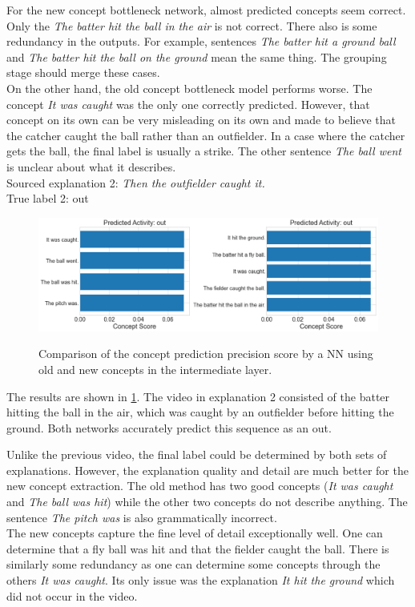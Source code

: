 For the new concept bottleneck network, almost predicted concepts seem correct.
Only the \emph{The batter hit the ball in the air} is not correct.
There also is some redundancy in the outputs. 
For example, sentences \emph{The batter hit a ground ball} and \emph{The batter hit the ball on the ground} mean the same thing.
The grouping stage should merge these cases. \\
On the other hand, the old concept bottleneck model performs worse.
The concept \emph{It was caught} was the only one correctly predicted. 
However, that concept on its own can be very misleading on its own and made to believe that the catcher caught the ball rather than an outfielder.
In a case where the catcher gets the ball, the final label is usually a strike.
The other sentence \emph{The ball went} is unclear about what it describes. \\

Sourced explanation 2: \emph{Then the outfielder caught it.} \\
True label 2: out

\begin{figure}[h]
\caption{Comparison of the concept prediction precision score by a NN using old and new concepts in the intermediate layer.}
\centering
\includegraphics[width=\textwidth]{concept-bottleneck-pipeline/expalantions_concepts2.png}
\label{concepts-results-2}
\end{figure}

The results are shown in \ref{concepts-results-2}.
The video in explanation 2 consisted of the batter hitting the ball in the air, which was caught by an outfielder before hitting the ground.
Both networks accurately predict this sequence as an out.

Unlike the previous video, the final label could be determined by both sets of explanations.
However, the explanation quality and detail are much better for the new concept extraction.
The old method has two good concepts (\emph{It was caught} and \emph{The ball was hit}) while the other two concepts do not describe anything.
The sentence \emph{The pitch was} is also grammatically incorrect.\\
The new concepts capture the fine level of detail exceptionally well. 
One can determine that a fly ball was hit and that the fielder caught the ball.
There is similarly some redundancy as one can determine some concepts through the others \emph{It was caught}.
Its only issue was the explanation \emph{It hit the ground} which did not occur in the video. \\


